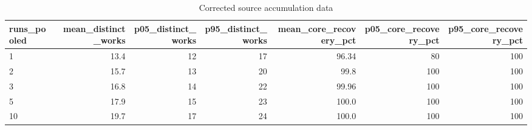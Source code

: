 \begin{table}[ht]
\centering
\caption{Corrected source accumulation data}
\scriptsize
\begin{tabular}{lrrrrrr}
\toprule
runs\_pooled & mean\_distinct\_works & p05\_distinct\_works & p95\_distinct\_works & mean\_core\_recovery\_pct & p05\_core\_recovery\_pct & p95\_core\_recovery\_pct \\
\midrule
1 & 13.4 & 12 & 17 & 96.34 & 80 & 100 \\
2 & 15.7 & 13 & 20 & 99.8 & 100 & 100 \\
3 & 16.8 & 14 & 22 & 99.96 & 100 & 100 \\
5 & 17.9 & 15 & 23 & 100.0 & 100 & 100 \\
10 & 19.7 & 17 & 24 & 100.0 & 100 & 100 \\
\bottomrule
\end{tabular}
\end{table}

